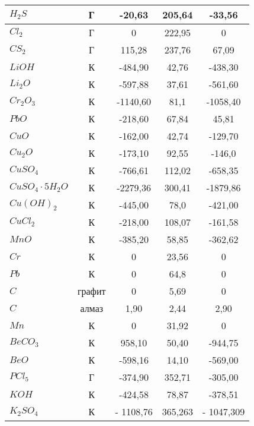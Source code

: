 \begin{longtable}[h]{|p{3cm}|c|c|c|c|}
 \hline $H_{2}S$ & Г & -20,63 & 205,64 & -33,56\\ 
 \hline $Cl_{2}$ & Г & 0 & 222,95 & 0\\ 
 \hline $CS_{2}$ & Г & 115,28 & 237,76 & 67,09\\ 
 \hline $LiOH$ & К & -484,90 & 42,76 & -438,30\\ 
 \hline $Li_{2}O$ & К & -597,88 & 37,61 & -561,60\\ 
 \hline $Cr_{2}O_{3}$ & К & -1140,60 & 81,1 & -1058,40\\ 
 \hline $PbO$ & К & -218,60 & 67,84 & 45,81\\ 
 \hline $CuO$ & К & -162,00 & 42,74 & -129,70\\ 
 \hline $Cu_{2}O$ & К & -173,10 & 92,55 & -146,0\\ 
 \hline $CuSO_{4}$ & К & -766,61 & 112,02 & -658,35\\ 
 \hline $CuSO_{4}\cdot 5H_{2}O$ & К & -2279,36 & 300,41 & -1879,86\\ 
 \hline $Cu(OH)_{2}$ & К & -445,00 & 78,0 & -421,00\\ 
 \hline $CuCl_{2}$ & К & -218,00 & 108,07 & -161,58\\ 
 \hline $MnO$ & К & -385,20 & 58,85 & -362,62\\ 
 \hline $Cr$ & К & 0 & 23,56 & 0\\ 
 \hline $Pb$ & К & 0 & 64,8 & 0\\ 
 \hline $C$ & графит & 0 & 5,69 & 0\\ 
 \hline $C$ & алмаз & 1,90 & 2,44 & 2,90\\ 
 \hline $Mn$ & К & 0 & 31,92 & 0\\ 
 \hline $BeCO_{3}$ & К & 958,10 & 50,40 & -944,75\\ 
 \hline $BeO$ & К & -598,16 & 14,10 & -569,00\\ 
 \hline $PCl_{5}$ & Г & -374,90 & 352,71 & -305,00\\ 
 \hline $KOH$ & К & -424,58 & 78,87 & -378,51\\ 
 \hline $K_{2}SO_{4}$  & К & - 1108,76 & 365,263 & - 1047,309\\
 \hline
\end{longtable}
